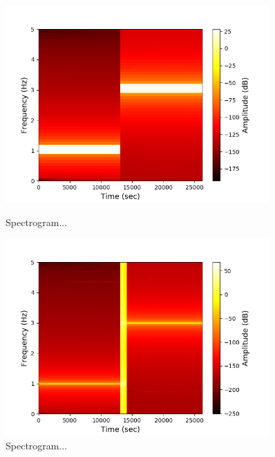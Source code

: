 \begin{figure}[H]
\centering
\begin{minipage}{0.49\textwidth}
\centering
\includegraphics[width=0.9\textwidth]{figures/validation/stft/1.png}
\caption{Spectrogram...}
\label{fig:test_stft1}
\end{minipage}
\begin{minipage}{0.49\textwidth}
\centering
\includegraphics[width=0.9\textwidth]{figures/validation/stft/2.png}
\caption{Spectrogram...}
\label{fig:test_stft2}
\end{minipage}
\end{figure}













